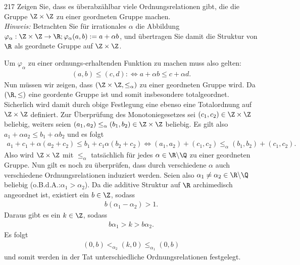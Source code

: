 \begin{algebraUE}{217}
Zeigen Sie, dass es überabzählbar viele Ordnungsrelationen gibt, die die Gruppe
$\Z \times \Z$ zu einer geordneten Gruppe machen. \\
\textit{Hinweis:} Betrachten Sie für irrationales $\alpha$ die Abbildung
$\varphi_{\alpha}: \Z \times \Z \to \R; \varphi_{\alpha}(a,b) := a + \alpha b$,
und übertragen Sie damit die Struktur von $\R$ als geordnete Gruppe auf $\Z \times \Z$.
\end{algebraUE}
\begin{solution}
Um $\varphi_{\alpha}$ zu einer ordnungs-erhaltenden Funktion zu machen muss also gelten:
\begin{align*}
  (a,b) \leq (c,d) :\iff a + \alpha b \leq c + \alpha d.
\end{align*}
Nun müssen wir zeigen, dass $(\Z \times \Z, \leq_{\alpha})$ zu einer geordneten Gruppe wird.
Da $(\R,\leq)$ eine geordente Gruppe ist und somit insbesondere totalgeordnet.
Sicherlich wird damit durch obige Festlegung eine ebenso eine Totalordnung
auf $\Z \times \Z$ definiert.
Zur Überprüfung des Monotoniegesetzes sei $(c_1,c_2) \in \Z \times \Z$ beliebig,
weiters seien $(a_1,a_2) \leq_{\alpha} (b_1,b_2) \in \Z \times \Z$ beliebig.
Es gilt also $a_1 + \alpha a_2 \leq b_1 + \alpha b_2$ und es folgt
\begin{align*}
  a_1 + c_1 + \alpha (a_2 + c_2) \leq b_1 + c_1 \alpha (b_2 + c_2) \iff
  (a_1,a_2) + (c_1,c_2) \leq_{\alpha} (b_1,b_2) + (c_1,c_2).
\end{align*}
Also wird $\Z \times \Z$ mit $\leq_{\alpha}$ tatsächlich für jedes $\alpha \in \R\backslash\Q$
zu einer geordneten Gruppe. Nun gilt es noch zu überprüfen, dass durch
verschiedene $\alpha$ auch verschiedene Ordnungsrelationen induziert werden.
Seien also $\alpha_1 \neq \alpha_2 \in \R\backslash\Q$ beliebig
(o.B.d.A.:$\alpha_1 > \alpha_2$).
Da die additive Struktur auf $\R$ archimedisch angeordnet ist, existiert ein $b \in \Z$, sodass
\begin{align*}
  b(\alpha_1 - \alpha_2) > 1.
\end{align*}
Daraus gibt es ein $k \in \Z$, sodass
\begin{align*}
  b\alpha_1 > k > b\alpha_2.
\end{align*}
Es folgt
\begin{align*}
  (0,b) <_{\alpha_2} (k,0) \leq_{\alpha_1} (0,b)
\end{align*}
und somit werden in der Tat unterschiedliche Ordnungsrelationen festgelegt.
\end{solution}
